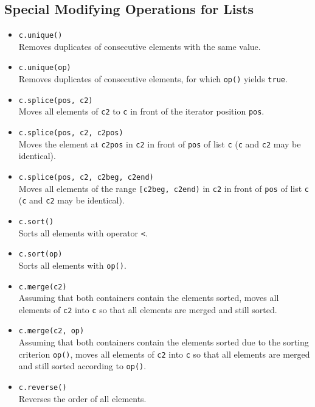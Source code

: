 \documentclass{report}
\begin{document}
\subsection{Special Modifying Operations for Lists}
\begin{itemize}
    \item \texttt{c.unique()} \\
    Removes duplicates of consecutive elements with the same value.
    
    \item \texttt{c.unique(op)} \\
    Removes duplicates of consecutive elements, for which \texttt{op()} yields \texttt{true}.
    
    \item \texttt{c.splice(pos, c2)} \\
    Moves all elements of \texttt{c2} to \texttt{c} in front of the iterator position \texttt{pos}.
    
    \item \texttt{c.splice(pos, c2, c2pos)} \\
    Moves the element at \texttt{c2pos} in \texttt{c2} in front of \texttt{pos} of list \texttt{c} (\texttt{c} and \texttt{c2} may be identical).
    
    \item \texttt{c.splice(pos, c2, c2beg, c2end)} \\
    Moves all elements of the range \texttt{[c2beg, c2end)} in \texttt{c2} in front of \texttt{pos} of list \texttt{c} (\texttt{c} and \texttt{c2} may be identical).
    
    \item \texttt{c.sort()} \\
    Sorts all elements with operator \texttt{<}.
    
    \item \texttt{c.sort(op)} \\
    Sorts all elements with \texttt{op()}.
    
    \item \texttt{c.merge(c2)} \\
    Assuming that both containers contain the elements sorted, moves all elements of \texttt{c2} into \texttt{c} so that all elements are merged and still sorted.
    
    \item \texttt{c.merge(c2, op)} \\
    Assuming that both containers contain the elements sorted due to the sorting criterion \texttt{op()}, moves all elements of \texttt{c2} into \texttt{c} so that all elements are merged and still sorted according to \texttt{op()}.
    
    \item \texttt{c.reverse()} \\
    Reverses the order of all elements.
\end{itemize}
\end{document}
